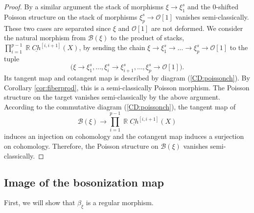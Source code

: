 \documentclass[reqno]{amsart}
\DeclareMathOperator\R{\mathbb R}
\theoremstyle{definition}
\theoremstyle{remark}
\newcommand{\cO}{\mathcal{O}}
\newcommand{\sB}{\mathscr{B}}
\newcommand{\uchain}{\underline{Ch}}
\newcommand{\am}{\overrightarrow{m}}
\newcommand{\amu}{\overrightarrow{\mu}}
\numberwithin{equation}{section}
\begin{document}
\begin{proof}
 

By a similar argument the stack of morphisms $\xi\to \xi^s_1$ and the 0-shifted Poisson structure on the stack of morphisms $\xi^s_p\to \cO[1]$ vanishes semi-classically. These two cases are separated since $\xi$ and $\cO[1]$ are not deformed. We consider the natural morphism from $\sB(\xi)$ to the product of stacks, $\prod_{i=1}^{p-1} \R\uchain^{[i,i+1]}(X)$, by sending the chain $\xi\to \xi^{s}_1\to\ldots\to \xi^{s}_{p}\to \cO[1]$ to the tuple
\[
\Big(\xi\to \xi^s_1,\ldots,\xi^s_{i}\to \xi^s_{i+1},\ldots,\xi^s_p\to\cO[1]\Big).
\] Its tangent map and cotangent map is described by diagram (\ref{CD:poissonch}). 
By Corollary \ref{cor:fiberprod}, this is a semi-classically Poisson morphism. The Poisson structure on the target vanishes semi-classically by the above argument. According to the commutative diagram (\ref{CD:poissonch}), the tangent map of 
\[
\sB(\xi) \to \prod_{i=1}^{p-1} \R\uchain^{[i,i+1]}(X)
\]
induces an injection on cohomology and the cotangent map induces a surjection on cohomology. Therefore, the Poisson structure on $\sB(\xi)$ vanishes semi-classically.
\end{proof}



\subsection{Image of the bosonization map}

First, we will show that $\beta_\xi$ is a regular morphism. 
\end{document}
